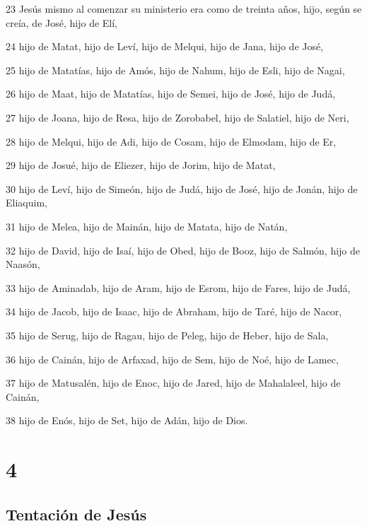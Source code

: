 \par 23 Jesús mismo al comenzar su ministerio era como de treinta años, hijo, según se creía, de José, hijo de Elí,
\par 24 hijo de Matat, hijo de Leví, hijo de Melqui, hijo de Jana, hijo de José,
\par 25 hijo de Matatías, hijo de Amós, hijo de Nahum, hijo de Esli, hijo de Nagai,
\par 26 hijo de Maat, hijo de Matatías, hijo de Semei, hijo de José, hijo de Judá,
\par 27 hijo de Joana, hijo de Resa, hijo de Zorobabel, hijo de Salatiel, hijo de Neri,
\par 28 hijo de Melqui, hijo de Adi, hijo de Cosam, hijo de Elmodam, hijo de Er,
\par 29 hijo de Josué, hijo de Eliezer, hijo de Jorim, hijo de Matat,
\par 30 hijo de Leví, hijo de Simeón, hijo de Judá, hijo de José, hijo de Jonán, hijo de Eliaquim,
\par 31 hijo de Melea, hijo de Mainán, hijo de Matata, hijo de Natán,
\par 32 hijo de David, hijo de Isaí, hijo de Obed, hijo de Booz, hijo de Salmón, hijo de Naasón,
\par 33 hijo de Aminadab, hijo de Aram, hijo de Esrom, hijo de Fares, hijo de Judá,
\par 34 hijo de Jacob, hijo de Isaac, hijo de Abraham, hijo de Taré, hijo de Nacor,
\par 35 hijo de Serug, hijo de Ragau, hijo de Peleg, hijo de Heber, hijo de Sala,
\par 36 hijo de Cainán, hijo de Arfaxad, hijo de Sem, hijo de Noé, hijo de Lamec,
\par 37 hijo de Matusalén, hijo de Enoc, hijo de Jared, hijo de Mahalaleel, hijo de Cainán,
\par 38 hijo de Enós, hijo de Set, hijo de Adán, hijo de Dios.

\chapter{4}

\section*{Tentación de Jesús}

